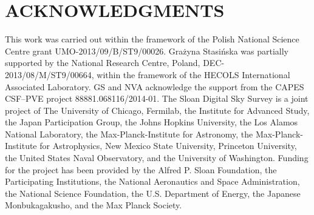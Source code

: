 \documentclass[utf8]{frontiersSCNS}
\begin{document}
\section*{ACKNOWLEDGMENTS}

This work was carried out within the framework of the Polish National Science Centre grant UMO-2013/09/B/ST9/00026.  Gra\.zyna Stasi\'nska was partially supported by the National Research Centre, Poland, DEC-2013/08/M/ST9/00664, within the framework of the HECOLS International Associated Laboratory. GS and NVA acknowledge the support from the CAPES CSF--PVE project 88881.068116/2014-01. The Sloan Digital Sky Survey is a joint project of The University of Chicago, Fermilab, the Institute for Advanced Study, the Japan Participation Group, the Johns Hopkins University, the Los Alamos National Laboratory, the Max-Planck-Institute for Astronomy, the Max-Planck-Institute for Astrophysics, New Mexico State University, Princeton University, the United States Naval Observatory, and the University of Washington.  Funding for the project has been provided by the Alfred P. Sloan Foundation, the Participating Institutions, the National Aeronautics and Space Administration, the National Science Foundation, the U.S. Department of Energy, the Japanese Monbukagakusho, and the Max Planck Society.

 

\end{document}

